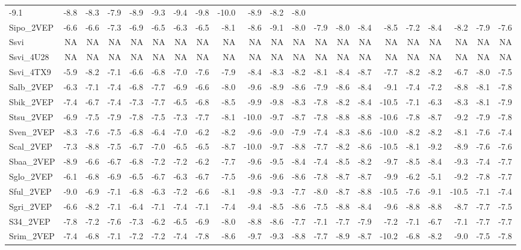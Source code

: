 \documentclass[12pt,twoside]{reedthesis}
\begin{document}
\begin{longtable}[c]{@{}lrrrrrrrrrrrrrrrrrrrr@{}}
  -9.1 & -8.8 & -8.3 & -7.9 & -8.9 & -9.3 & -9.4 & -9.8 & -10.0 & -8.9 &
  -8.2 & -8.0\tabularnewline
  Sipo\_2VEP & -6.6 & -6.6 & -7.3 & -6.9 & -6.5 & -6.3 & -6.5 & -8.1 &
  -8.6 & -9.1 & -8.0 & -7.9 & -8.0 & -8.4 & -8.5 & -7.2 & -8.4 & -8.2 &
  -7.9 & -7.6\tabularnewline
  Ssvi & NA & NA & NA & NA & NA & NA & NA & NA & NA & NA & NA & NA & NA &
  NA & NA & NA & NA & NA & NA & NA\tabularnewline
  Ssvi\_4U28 & NA & NA & NA & NA & NA & NA & NA & NA & NA & NA & NA & NA &
  NA & NA & NA & NA & NA & NA & NA & NA\tabularnewline
  Ssvi\_4TX9 & -5.9 & -8.2 & -7.1 & -6.6 & -6.8 & -7.0 & -7.6 & -7.9 &
  -8.4 & -8.3 & -8.2 & -8.1 & -8.4 & -8.7 & -7.7 & -8.2 & -8.2 & -6.7 &
  -8.0 & -7.5\tabularnewline
  Salb\_2VEP & -6.3 & -7.1 & -7.4 & -6.8 & -7.7 & -6.9 & -6.6 & -8.0 &
  -9.6 & -8.9 & -8.6 & -7.9 & -8.6 & -8.4 & -9.1 & -7.4 & -7.2 & -8.8 &
  -8.1 & -7.8\tabularnewline
  Sbik\_2VEP & -7.4 & -6.7 & -7.4 & -7.3 & -7.7 & -6.5 & -6.8 & -8.5 &
  -9.9 & -9.8 & -8.3 & -7.8 & -8.2 & -8.4 & -10.5 & -7.1 & -6.3 & -8.3 &
  -8.1 & -7.9\tabularnewline
  Stsu\_2VEP & -6.9 & -7.5 & -7.9 & -7.8 & -7.5 & -7.3 & -7.7 & -8.1 &
  -10.0 & -9.7 & -8.7 & -7.8 & -8.8 & -8.8 & -10.6 & -7.8 & -8.7 & -9.2 &
  -7.9 & -7.8\tabularnewline
  Sven\_2VEP & -8.3 & -7.6 & -7.5 & -6.8 & -6.4 & -7.0 & -6.2 & -8.2 &
  -9.6 & -9.0 & -7.9 & -7.4 & -8.3 & -8.6 & -10.0 & -8.2 & -8.2 & -8.1 &
  -7.6 & -7.4\tabularnewline
  Scal\_2VEP & -7.3 & -8.8 & -7.5 & -6.7 & -7.0 & -6.5 & -6.5 & -8.7 &
  -10.0 & -9.7 & -8.8 & -7.7 & -8.2 & -8.6 & -10.5 & -8.1 & -9.2 & -8.9 &
  -7.6 & -7.6\tabularnewline
  Sbaa\_2VEP & -8.9 & -6.6 & -6.7 & -6.8 & -7.2 & -7.2 & -6.2 & -7.7 &
  -9.6 & -9.5 & -8.4 & -7.4 & -8.5 & -8.2 & -9.7 & -8.5 & -8.4 & -9.3 &
  -7.4 & -7.7\tabularnewline
  Sglo\_2VEP & -6.1 & -6.8 & -6.9 & -6.5 & -6.7 & -6.3 & -6.7 & -7.5 &
  -9.6 & -9.6 & -8.6 & -7.8 & -8.7 & -8.7 & -9.9 & -6.2 & -5.1 & -9.2 &
  -7.8 & -7.7\tabularnewline
  Sful\_2VEP & -9.0 & -6.9 & -7.1 & -6.8 & -6.3 & -7.2 & -6.6 & -8.1 &
  -9.8 & -9.3 & -7.7 & -8.0 & -8.7 & -8.8 & -10.5 & -7.6 & -9.1 & -10.5 &
  -7.1 & -7.4\tabularnewline
  Sgri\_2VEP & -6.6 & -8.2 & -7.1 & -6.4 & -7.1 & -7.4 & -7.1 & -7.4 &
  -9.4 & -8.5 & -8.6 & -7.5 & -8.8 & -8.4 & -9.6 & -8.8 & -8.8 & -8.7 &
  -7.7 & -7.5\tabularnewline
  S34\_2VEP & -7.8 & -7.2 & -7.6 & -7.3 & -6.2 & -6.5 & -6.9 & -8.0 & -8.8
  & -8.6 & -7.7 & -7.1 & -7.7 & -7.9 & -7.2 & -7.1 & -6.7 & -7.1 & -7.7 &
  -7.7\tabularnewline
  Srim\_2VEP & -7.4 & -6.8 & -7.1 & -7.2 & -7.2 & -7.4 & -7.8 & -8.6 &
  -9.7 & -9.3 & -8.8 & -7.7 & -8.9 & -8.7 & -10.2 & -6.8 & -8.2 & -9.0 &
  -7.5 & -7.8\tabularnewline

\end{longtable}
\end{document}
